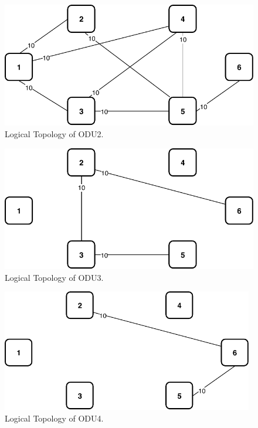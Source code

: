 \begin{figure}[h!]
\centering
\includegraphics[width=12cm]{sdf/ilp/opaque_protection/figures/logical_topology_ODU2_medium}
\caption{Logical Topology of ODU2.}
\label{logical_ODU2_protectionmedium}
\end{figure}

\begin{figure}[h!]
\centering
\includegraphics[width=12cm]{sdf/ilp/opaque_protection/figures/logical_topology_ODU3_medium}
\caption{Logical Topology of ODU3.}
\label{logical_ODU3_protectionmedium}
\end{figure}
\newpage
\begin{figure}[h!]
\centering
\includegraphics[width=11cm]{sdf/ilp/opaque_protection/figures/logical_topology_ODU4_medium}
\caption{Logical Topology of ODU4.}
\label{logical_ODU4_protectionmedium}
\end{figure}

